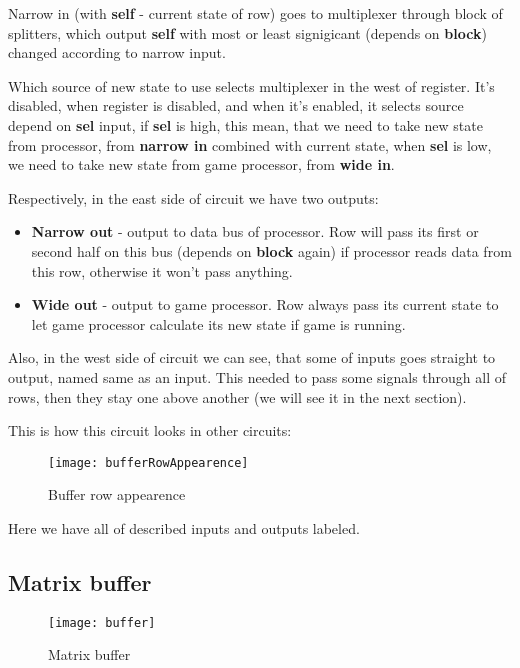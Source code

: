 Narrow in (with \textbf{self} - current state of row) goes to multiplexer through block of splitters, which output \textbf{self} with most or least signigicant (depends on \textbf{block}) changed according to narrow input.

Which source of new state to use selects multiplexer in the west of register. It's disabled, when register is disabled, and when it's enabled, it selects source depend on \textbf{sel} input, if \textbf{sel} is high, this mean, that we need to take new state from processor, from \textbf{narrow in} combined with current state, when \textbf{sel} is low, we need to take new state from game processor, from \textbf{wide in}.

Respectively, in the east side of circuit we have two outputs:

\begin{itemize}
	\item \textbf{Narrow out} - output to data bus of processor. Row will pass its first or second half on this bus (depends on \textbf{block} again) if processor reads data from this row, otherwise it won't pass anything.
	\item \textbf{Wide out} - output to game processor. Row always pass its current state to let game processor calculate its new state if game is running.
\end{itemize}

Also, in the west side of circuit we can see, that some of inputs goes straight to output, named same as an input. This needed to pass some signals through all of rows, then they stay one above another (we will see it in the next section).

This is how this circuit looks in other circuits:

\begin{figure}[ht]
	\centering
	\texttt{[image: bufferRowAppearence]}
	\caption{Buffer row appearence}
\end{figure}

\clearpage

Here we have all of described inputs and outputs labeled.

\subsection*{Matrix buffer}

\begin{figure}[ht]
	\centering
	\texttt{[image: buffer]}
	\caption{Matrix buffer}
\end{figure}


